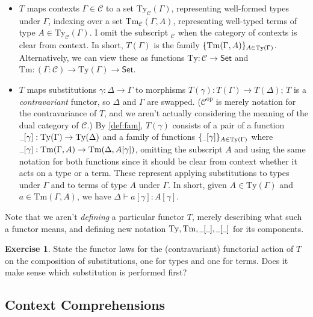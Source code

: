 \documentclass{article}
\renewcommand{\_}{\textrm{\textscale{.5}{\textunderscore}}}
\DeclarePairedDelimiter{\set}{\{}{\}}
\newcommand{\op}[1]{#1^{\mathrm{op}}}
\newcommand{\Tm}{\mathrm{Tm}}
\newcommand{\Ty}{\mathrm{Ty}}
\newcommand{\Fun}[3]{(#1 \mathbin{:} #2) \mathrel{\to} #3}
\newcommand{\Set}{\mathsf{Set}}
\theoremstyle{definition}
\newtheorem{exercise}[definition]{Exercise}
\theoremstyle{plain}
\begin{document}
\begin{itemize}
    \item $T$ maps contexts $\Gamma \in \mathcal{C}$ to a set $\Ty_{\mathcal{C}}(\Gamma)$,
    representing well-formed types under $\Gamma$,
    indexing over a set $\Tm_{\mathcal{C}}(\Gamma, A)$,
    representing well-typed terms of type $A \in \Ty_{\mathcal{C}}(\Gamma)$.
    I omit the subscript $_{\mathcal{C}}$ when the category of contexts is clear from context.
    In short, $T(\Gamma)$ is the family $\set{\Tm(\Gamma, A)}_{A \in \Ty(\Gamma)}$.
    Alternatively, we can view these as functions
    $\Ty : \mathcal{C} \to \Set$ and
    $\Tm : \Fun{\Gamma}{\mathcal{C}}{\Ty(\Gamma) \to \Set}$.
    \item $T$ maps substitutions $\gamma : \Delta \to \Gamma$
    to morphisms $T(\gamma) : T(\Gamma) \to T(\Delta)$;
    $T$ is a \emph{contravariant} functor, so $\Delta$ and $\Gamma$ are swapped.
    ($\op{\mathcal{C}}$ is merely notation for the contravariance of $T$,
    and we aren't actually considering the meaning of the dual category of $\mathcal{C}$.)
    By \cref{def:fam}, $T(\gamma)$ consists of a pair of a function $\_[\gamma] : \Ty(\Gamma) \to \Ty(\Delta)$
    and a family of functions $\set{\_[\gamma]}_{A \in \Ty(\Gamma)}$ where
    $\_[\gamma] : \Tm(\Gamma, A) \to \Tm(\Delta, A[\gamma])$,
    omitting the subscript $A$ and using the same notation for both functions
    since it should be clear from context whether it acts on a type or a term.
    These represent applying substitutions to types under $\Gamma$
    and to terms of type $A$ under $\Gamma$.
    In short, given $A \in \Ty(\Gamma)$ and $a \in \Tm(\Gamma, A)$,
    we have $\Delta \vdash a[\gamma] : A[\gamma]$.
\end{itemize}

Note that we aren't \emph{defining} a particular functor $T$,
merely describing what such a functor means,
and defining new notation $\Ty, \Tm, \_[\_], \_[\_]$ for its components.

\begin{exercise}
State the functor laws for the (contravariant) functorial action of $T$ on the composition of substitutions,
one for types and one for terms.
Does it make sense which substitution is performed first?
\end{exercise}

\subsection{Context Comprehensions}
\end{document}
